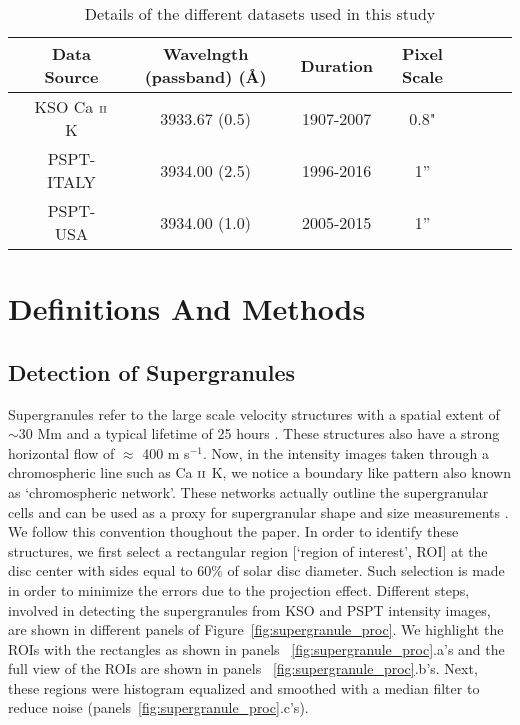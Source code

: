 \documentclass[manuscript]{aastex}	%
\begin{document}
 \begin{table}[!htbp]
\begin{center}
\centering
\caption{  Details of the different datasets used in this study}  

\label{table:data}
\begin{tabular}{lcccc r@{   }l c} 


  \hline
  & \multicolumn{1}{c}{Data Source}& \multicolumn{1}{c}{Wavelngth (passband) (\r{A})} & \multicolumn{1}{c}{Duration} & \multicolumn{1}{c}{Pixel Scale}  \\
     
     \hline
     &  KSO C\MakeLowercase{a} $\scriptsize{{\textrm{II}}}$ K & 3933.67 (0.5) & 1907-2007 &  0.8" \\
     &  PSPT-ITALY & 3934.00 (2.5) &  1996-2016 & 1''\\
     &  PSPT-USA & 3934.00 (1.0) &  2005-2015 & 1''\\
      \hline


\end{tabular}
\end{center}
\end{table}


\section{Definitions And Methods} \label{sec:def}

   \subsection{Detection of Supergranules}
              Supergranules refer to the large scale velocity structures with a spatial extent of $\sim$30 $\mathrm{Mm}$ and a typical lifetime of 25 hours \citep{Rieutord2010}. These structures also have a strong horizontal flow of $\approx$ 400 m s$^{-1}$. Now, in the intensity images taken through a chromospheric line such as C\MakeLowercase{a} $\scriptsize{{\textrm{II}}}$ K, we notice a boundary like pattern also known as `chromospheric network'. These networks actually outline the supergranular cells and can be used as a proxy for supergranular shape and size measurements \citep{1964ApJ...140.1120S}. We follow this convention thoughout the paper. In order to identify these structures, we first select a rectangular region [`region of interest', ROI] at the disc center with sides equal to $60\%$ of solar disc diameter. Such selection is made in order to minimize the errors due to the projection effect. Different steps, involved in detecting the supergranules from KSO and PSPT intensity images, are shown in different panels of Figure~\ref{fig:supergranule_proc}. We highlight the ROIs with the rectangles as shown in panels ~\ref{fig:supergranule_proc}.a's and the full view of the ROIs are shown in panels ~\ref{fig:supergranule_proc}.b's. Next, these regions were histogram equalized and smoothed with a median filter to reduce noise (panels~\ref{fig:supergranule_proc}.c's).
\end{document}
